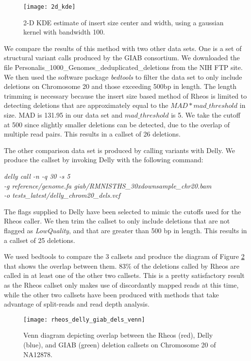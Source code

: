 \begin{figure}[h!]
    \texttt{[image: 2d\_kde]}
    \centering
    \caption {2-D KDE estimate of insert size center and width, using a gaussian kernel with bandwidth 100.}
    \label{fig:2d_kde}
\end{figure}

We compare the results of this method with two other data sets. One is a set of structural variant calls produced by the GIAB consortium. We downloaded the file Personalis\_1000\_Genomes\_deduplicated\_deletions from the NIH FTP site\autocite{giab_svs}. We then used the software package \emph{bedtools}\autocite{quinlan2010bedtools} to filter the data set to only include deletions on Chromosome 20 and those exceeding 500bp in length. The length trimming is necessary because the insert size based method of Rheos is limited to detecting deletions that are approximately equal to the $MAD * mad\_threshold$ in size. MAD is 131.95 in our data set and $mad\_threshold$ is 5. We take the cutoff at 500 since slightly smaller deletions can be detected, due to the overlap of multiple read pairs. This results in a callset of 26 deletions.

The other comparison data set is produced by calling variants with Delly\autocite{rausch2012delly}. We produce the callset by invoking Delly with the following command:

\emph{delly call -n -q 30 -s 5\\
 -g reference/genome.fa giab/RMNISTHS\_30xdownsample\_chr20.bam \\
 -o tests\_latest/delly\_chrom20\_dels.vcf}

The flags supplied to Delly have been selected to mimic the cutoffs used for the Rheos caller. We then trim the callset to only include deletions that are not flagged as \emph{LowQuality}, and that are greater than 500 bp in length. This results in a callset of 25 deletions.

We used bedtools to compare the 3 callsets and produce the diagram of Figure \ref{fig:rheos_delly_giab_dels_venn} that shows the overlap between them. 83\% of the deletions called by Rheos are called in at least one of the other two callsets. This is a pretty satisfactory result as the Rheos callset only makes use of discordantly mapped reads at this time, while the other two callsets have been produced with methods that take advantage of split-reads and read depth analysis. 

\begin{figure}[h!]
    \texttt{[image: rheos\_delly\_giab\_dels\_venn]}
    \centering
    \caption {Venn diagram depicting overlap between the Rheos (red), Delly (blue), and GIAB (green) deletion callsets on Chromosome 20 of NA12878.}
    \label{fig:rheos_delly_giab_dels_venn}
\end{figure}


